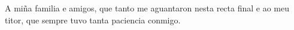 \begin{agradecimientos}

	A miña familia e amigos, que tanto me aguantaron nesta recta final e ao meu titor, que sempre tuvo tanta paciencia conmigo.               %

\end{agradecimientos}
\paginablanca